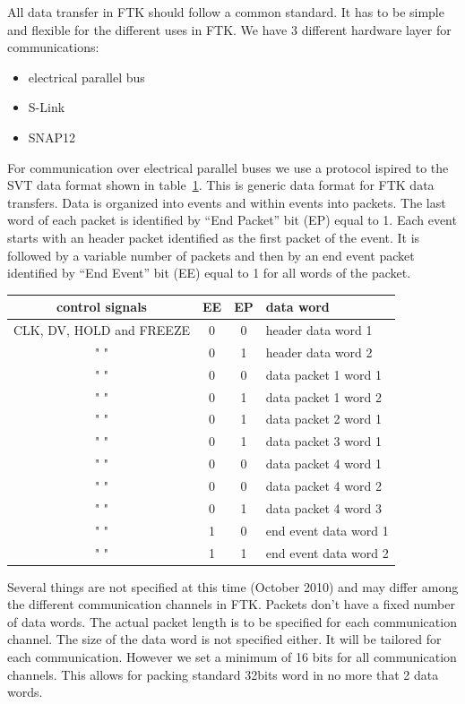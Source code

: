 \documentclass[10pt]{article}
\numberwithin{figure}{section}
\numberwithin{equation}{section}
\numberwithin{table}{section}
\newcommand{\0}{\phantom{0}}
\begin{document}
All data transfer in FTK should follow a common standard. It has to be simple and flexible for the different uses in FTK.
We have 3 different hardware layer for communications:
\begin{itemize}
\item electrical parallel bus
\item S-Link 
\item SNAP12
\end{itemize}

For communication over electrical parallel buses we use a protocol ispired to the SVT data format shown in table~\ref{tab:generic_format}.
This is generic data format for FTK data transfers.
Data is organized into events and within events into packets. The last word of each packet is identified by ``End Packet'' bit (EP) equal to 1.
Each event starts with an header packet identified as the first packet of the event.
It is followed by a variable number of packets and then by an end event packet identified by ``End Event'' bit (EE) equal to 1 for all words of the packet.

\begin{table}[h]
\begin{tabular}{c|c|c|l}
control signals & EE & EP & data word    \\ \hline \hline
CLK, DV, HOLD and FREEZE & 0 & 0 & header data word 1 \\
 "   " & 0 & 1 & header data word 2 \\ \hline
 "   " & 0 & 0 & data packet 1 word 1 \\ 
 "   " & 0 & 1 & data packet 1 word 2 \\  \hline
 "   " & 0 & 1 & data packet 2 word 1 \\ \hline
 "   " & 0 & 1 & data packet 3 word 1 \\ \hline
 "   " & 0 & 0 & data packet 4 word 1 \\ 
 "   " & 0 & 0 & data packet 4 word 2 \\ 
 "   " & 0 & 1 & data packet 4 word 3 \\ \hline
 "   " & 1 & 0 & end event data word 1 \\
 "   " & 1 & 1 & end event data word 2
\label{tab:generic_format}
\end{tabular}
\end{table}

Several things are not specified at this time (October 2010) and may differ among the different communication channels in FTK.
Packets don't have a fixed number of data words. The actual packet length is to be specified for each communication channel.
The size of the data word is not specified either. It will be tailored for each communication.
However we set a minimum of 16 bits for all communication channels.
This allows for packing standard 32bits word in no more that 2 data words.
\end{document}
